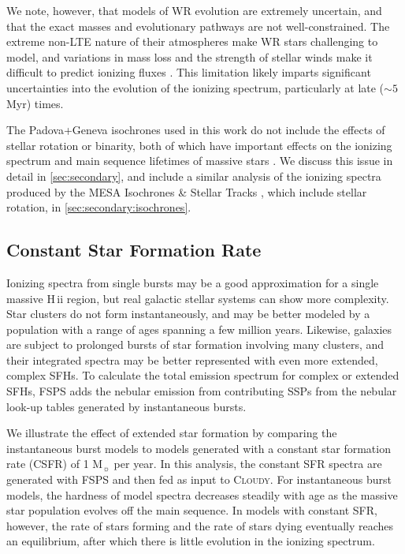 \documentclass[trackchanges, twocolumn, tighten]{aastex61}
\newcommand{\Sec}[1]{\autoref{sec:#1}}
\newcommand{\FSPS}{{\sc FSPS}\xspace}
\newcommand{\Cloudy}{\textsc{Cloudy}\xspace}
\newcommand\Msun{\ensuremath{\mathrm{M_{\sun}}}}
\newcommand{\hii}{H\,{\sc ii}\xspace}
\begin{document}
We note, however, that models of WR evolution are extremely uncertain, and that the exact masses and evolutionary pathways are not well-constrained. The extreme non-LTE nature of their atmospheres make WR stars challenging to model, and variations in mass loss and the strength of stellar winds make it difficult to predict ionizing fluxes \citep[see review by][and references within]{Crowther07}. This limitation likely imparts significant uncertainties into the evolution of the ionizing spectrum, particularly at late (${\sim}5$ Myr) times.

The Padova+Geneva isochrones used in this work do not include the effects of stellar rotation or binarity, both of which have important effects on the ionizing spectrum and main sequence lifetimes of massive stars \citep[e.g.,][]{Levesque12, Eldridge12}. We discuss this issue in detail in \Sec{secondary}, and include a similar analysis of the ionizing spectra produced by the MESA Isochrones \& Stellar Tracks \citep[MIST,][]{Dotter16, Choi16}, which include stellar rotation, in \Sec{secondary:isochrones}.

\subsection{Constant Star Formation Rate}\label{sec:spectra:CSFH}

Ionizing spectra from single bursts may be a good approximation for a single massive \hii region, but real galactic stellar systems can show more complexity. Star clusters do not form instantaneously, and may be better modeled by a population with a range of ages spanning a few million years. Likewise, galaxies are subject to prolonged bursts of star formation involving many clusters, and their integrated spectra may be better represented with even more extended, complex SFHs. To calculate the total emission spectrum for complex or extended SFHs, FSPS adds the nebular emission from contributing SSPs from the nebular look-up tables generated by instantaneous bursts.

We illustrate the effect of extended star formation by comparing the instantaneous burst models to models generated with a constant star formation rate (CSFR) of 1 \Msun{} per year. In this analysis, the constant SFR spectra are generated with \FSPS and then fed as input to \Cloudy. For instantaneous burst models, the hardness of model spectra decreases steadily with age as the massive star population evolves off the main sequence. In models with constant SFR, however, the rate of stars forming and the rate of stars dying eventually reaches an equilibrium, after which there is little evolution in the ionizing spectrum. 
\end{document}
